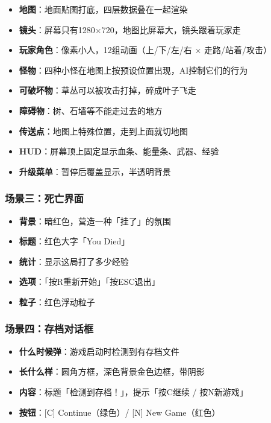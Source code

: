 \documentclass[12pt,a4paper]{article}
\begin{document}
\begin{itemize}[leftmargin=2em]
    \item \textbf{地图}：地面贴图打底，四层数据叠在一起渲染
    \item \textbf{镜头}：屏幕只有1280$\times$720，地图比屏幕大，镜头跟着玩家走
    \item \textbf{玩家角色}：像素小人，12组动画（上/下/左/右 $\times$ 走路/站着/攻击）
    \item \textbf{怪物}：四种小怪在地图上按预设位置出现，AI控制它们的行为
    \item \textbf{可破坏物}：草丛可以被攻击打掉，碎成叶子飞走
    \item \textbf{障碍物}：树、石墙等不能走过去的地方
    \item \textbf{传送点}：地图上特殊位置，走到上面就切地图
    \item \textbf{HUD}：屏幕顶上固定显示血条、能量条、武器、经验
    \item \textbf{升级菜单}：暂停后覆盖显示，半透明背景
\end{itemize}

\subsubsection{场景三：死亡界面}

\begin{itemize}[leftmargin=2em]
    \item \textbf{背景}：暗红色，营造一种「挂了」的氛围
    \item \textbf{标题}：红色大字「You Died」
    \item \textbf{统计}：显示这局打了多少经验
    \item \textbf{选项}：「按R重新开始」「按ESC退出」
    \item \textbf{粒子}：红色浮动粒子
\end{itemize}

\subsubsection{场景四：存档对话框}

\begin{itemize}[leftmargin=2em]
    \item \textbf{什么时候弹}：游戏启动时检测到有存档文件
    \item \textbf{长什么样}：圆角方框，深色背景金色边框，带阴影
    \item \textbf{内容}：标题「检测到存档！」，提示「按C继续 / 按N新游戏」
    \item \textbf{按钮}：[C] Continue（绿色）/ [N] New Game（红色）
\end{itemize}
\end{document}
